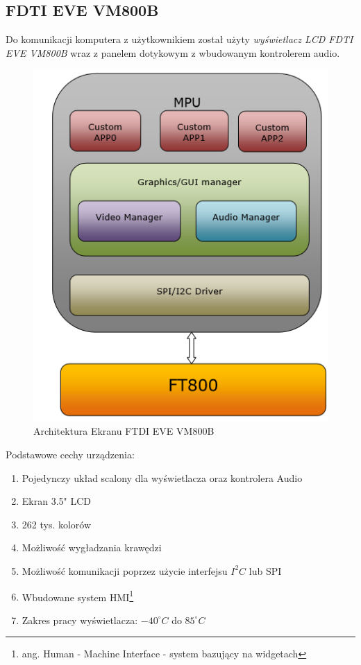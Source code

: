 \documentclass{xmgr}
\begin{document}
\subsection{FDTI EVE VM800B}
Do komunikacji komputera z użytkownikiem został użyty \emph{wyświetlacz LCD FDTI EVE VM800B} wraz z panelem dotykowym z wbudowanym kontrolerem audio. 
\begin{figure}[!h]
    \centering
    \includegraphics[height=0.4\textheight]{images/FTDIarchitecture.png}
    \caption{Architektura Ekranu FTDI EVE VM800B}
\end{figure}

Podstawowe cechy urządzenia\cite{FTDI}:
\begin{enumerate}
	\item Pojedynczy układ scalony dla wyświetlacza oraz kontrolera Audio
	\item Ekran 3.5" LCD
	\item 262 tys. kolorów
	\item Możliwość wygładzania krawędzi
	\item Możliwość komunikacji poprzez użycie interfejsu $I^2C$ lub SPI
	\item Wbudowane system HMI\footnote{ang. Human - Machine Interface - system bazujący na widgetach}
	\item Zakres pracy wyświetlacza: $-40^{\circ} C$ do $85^{\circ} C$ 
\end{enumerate}
\end{document}
